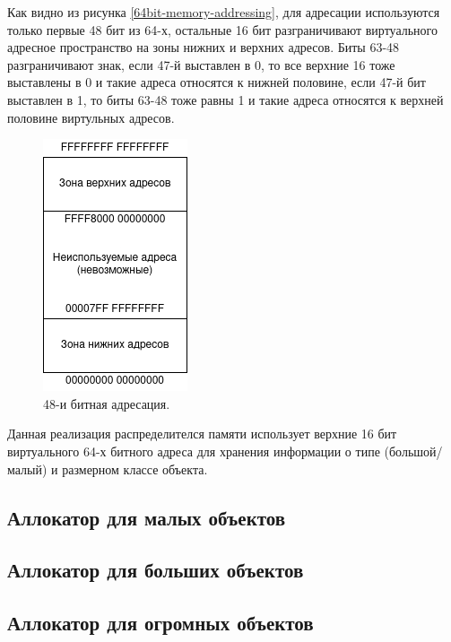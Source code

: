Как видно из рисунка \ref{64bit-memory-addressing}, для адресации используются только первые 48 бит из 64-х, остальные 16 бит разграничивают виртуального адресное пространство на зоны нижних и верхних адресов. Биты 63-48 разграничивают знак, если 47-й выставлен в 0, то все верхние 16 тоже выставлены в 0 и такие адреса относятся к нижней половине, если 47-й бит выставлен в 1, то биты 63-48 тоже равны 1 и такие адреса относятся к верхней половине виртульных адресов.

\begin{figure}[!h]
	\begin{center}
		\includegraphics[scale=0.6]{images/48bit-half-spaces.png}
		\caption{48-и битная адресация.}
		\label{48bit-half-spaces}
	\end{center}
\end{figure}

Данная реализация распределителся памяти использует верхние 16 бит виртуального 64-х битного адреса для хранения информации о типе (большой/малый) и размерном классе объекта.

\subsection{Аллокатор для малых объектов}

\subsection{Аллокатор для больших объектов}

\subsection{Аллокатор для огромных объектов}